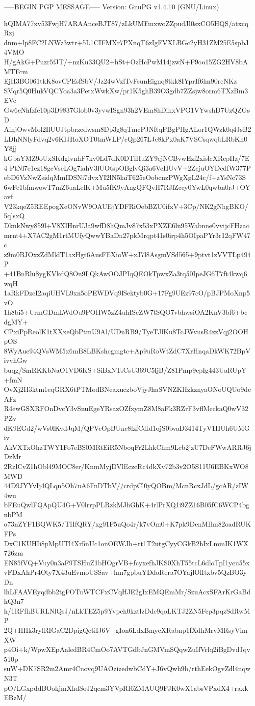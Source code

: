 -----BEGIN PGP MESSAGE-----
Version: GnuPG v1.4.10 (GNU/Linux)

hQIMA77xv53FwjH7ARAAnceBJT87/zLkUMFmxwoZZpudJl0sxCO5HQS/atxcqRzj
dnm+lp8FC2LNWz3wtr+5L1CIFMXr7PXnqT6zIgFVXLBGc2yH31ZM25E5spbJ4VMO
H/gAkG+Puzr5fJT/+nzKu33QU2+hSt+OzHcPwM14jzwN+F9oo15ZG2HV8bAMTFcm
EjH3BG061tkK8ovCPEsfSbV/Jz24wVzlTvFsunEignq8tkk8IYprIf6lm90reNKz
SVqr5Q0HukVQCYoa3a3PetxWwkXw/pr1K5ghB39O3gdb7ZZsjw8orm6TXzBm3EVc
Gw6eNhfzfe10p3D9837Glob0v3yvwISgn93h2VEm8hDihxVPG1VYwshD7UzQZGsD
AinjOwvMol2IlUUJtpbrzedwsm8Dp3g8qTmcPJNftqPBgPHgALor1QWzk0q4JsB2
LDhNNlyFdvq2v6KIJHoXOT0tmWLP/cQp267LJe8kPx0aK7VSCsqwqbLRbKh0Y8jj
kGbaYMZ9oUxSKdglvnhF7kv0Ld7dK0DTiHuZY9cjNCBvwEzi2xislcXRcpHz/7E4
PtNl7e1ez18gcVseLOg7iahV3lUOtspOBglvQi3a6VcHUvV+2ZcjuOYDcdfW377P
ebD6VzNwZsidqMmIDSNi7dvxYI2lN5laiT625eOobcnzPWgXgL24c/f+zYsNc73S
6wFc1bfmwowT7mZ6uaLelK+Mu5fK9yAngQFQvH7RJlZccy0YwL0qwbn0rJ+OYavf
V23kqeZ5REEpogXeONvW9OAUEjYDFRiOebBZU0ifxV+3Cp/NK2gNhgBKO/5qlsxQ
DknkNwy859l+V8XlHnrUJa9wfD8hQmJv87x53xPXZE6ln95Wabnne0vvijcFHzao
mrnt4+X7AC2gM1rtMUfyQwwYBaDn27pkMrqpt41s0irp4h5OIpaPYr3r12qFW47c
z9m0BJOxzZdMldT1axHgt6AusFEXioW+xJ7l8AsgmVSd565+9ptvt1zVVTLp494P
+41BnRlu8ygKVkdQ8On9LQkAwOOJPIqQEOkTpwxZa3tq50IpeJG6T7ft4kwq6wqH
1aRkFDzcI2aqiUHVL9xn5oPEWDVq9lSektyb0G+17Fg9UEz97cO/pBJPMoXnp5vO
1h8bi5+UrmGDmLWdOu9POHW5zZ4uhIScZW7tSQO7vbhwsiOA2KnV3bf6+bcdgMY+
CPxiPpReolK1tXXxeQbPtmU9Al/UDnRB9/TyeTJlKu8TcJWvusR4zzVqj2OOHpOS
8WyAuc94QVsWM5x6mB8LBKshcgmgtc+Ap9uRoWtZdC7XrHnqaDkWK72BpVivvhGw
buqg/SmRKKbNaO1VD6KS+SiBxNTsCsU369C5ljB/Z81Pmp9epIg443UaRUpY+fmN
OvXj2H3ktm1eqGRX6tPTModBNeaxuczboVjyJhaSVNZKHzkznyaONoUQUo9deAFz
R4ewGSXRFOnDvcY3vSnuEgeYRsazOZfxymZ8M8aFk3RZrF3vflMeckaQ0wV32PZv
dK9EGd2/wVs0lKvdJqM/QPVeOpBUnc8lzfCdld1ojS0bvaD3414TyV1HUh6UMGiv
AkVXTxOhzTWY1Fo7eBS0MRtEiR5NboqFr2LhkChm9Lcb2jzU7DeFWwARRJ6jDzMr
2RzlCvZ1hObl49MOC8er/KnmMyjDVlEczcRc4dkXv72b3v2O5S11U6EBKxWO8MWD
44D9JYYvIj4QLqn5Oh7uA6FnDTbV//crdpCl0yQOBm/McnRcxJdL/gcAR/zIW4wu
bFEuQwlFQApQU4G+V0lrrpPLRzkMJhGhK+4rlPrXQ1i9ZZ16B05fC6WCP4bgnbPM
o73nZYF1BQWK5/TIIfQRY/xg91F5uQo4r/k7vOm0+K7pk9DenMIlm82oadRUKFPs
DxC1KUHIi8pMpUTl4Xr5nUc1onOEWJh+rt1T2utgCyyCGkB2hIxLmmIK1WX726zm
EN85fVQ+Vuy0n3aF9TSHuZ1bHOgrVB+fcyxefhJKS0XhT55tcL6dloTpI1ycn55x
vFDxAhPr4Oty7X43uEvmoUSSav+hm7gpbuYDdoRera7OYajlOlItxbv5QzBO3yDn
lhLFAAVEyqdbb2tgFOTuWTCFxCVqHJE2gIxEMQEmMr/SzuAcxSFArKrGaBdhQ3n7
h/1RFfhBURLNlQsJ/nLkTEZ5p9Yvpeh0kztlzDde9qoLKTJ2ZN5Fcp3pqzSdRwMP
2Q+HHk3rylRIGaC2DpigQetiIJ6V+gIon6LdxBmycXRabnp1fXdhMrvMRsyVimXW
p4Oi+k/WpwXEpAaledBR4CmOo7AVTGdbJnGMVmSQqwZuIfVrlq2iBgDvdJqv510p
suW+DK7SR2m2Amr4Cnovq9UAOzizedwbCdY+J6vQwh9h/rthEekOgvZdl4nqwN3T
pO/LGxpddBOokjmXhdSoJ2qcm3YVpRI6ZMAUQ9FJK0wX1absVPxdX4+raxkEBzM/
